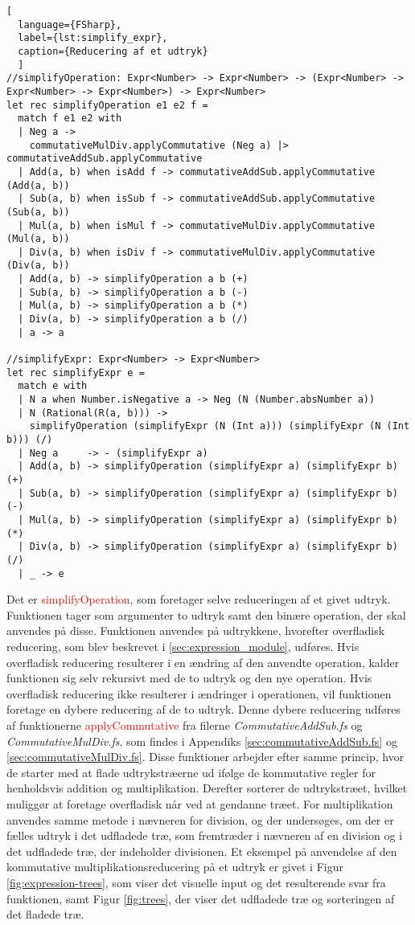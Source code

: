 \begin{lstlisting}[
  language={FSharp}, 
  label={lst:simplify_expr}, 
  caption={Reducering af et udtryk}
  ]
//simplifyOperation: Expr<Number> -> Expr<Number> -> (Expr<Number> -> Expr<Number> -> Expr<Number>) -> Expr<Number>
let rec simplifyOperation e1 e2 f = 
  match f e1 e2 with
  | Neg a -> 
    commutativeMulDiv.applyCommutative (Neg a) |> commutativeAddSub.applyCommutative
  | Add(a, b) when isAdd f -> commutativeAddSub.applyCommutative (Add(a, b))
  | Sub(a, b) when isSub f -> commutativeAddSub.applyCommutative (Sub(a, b))
  | Mul(a, b) when isMul f -> commutativeMulDiv.applyCommutative (Mul(a, b))
  | Div(a, b) when isDiv f -> commutativeMulDiv.applyCommutative (Div(a, b))
  | Add(a, b) -> simplifyOperation a b (+)
  | Sub(a, b) -> simplifyOperation a b (-)
  | Mul(a, b) -> simplifyOperation a b (*)
  | Div(a, b) -> simplifyOperation a b (/)
  | a -> a

//simplifyExpr: Expr<Number> -> Expr<Number>
let rec simplifyExpr e =
  match e with
  | N a when Number.isNegative a -> Neg (N (Number.absNumber a))
  | N (Rational(R(a, b))) -> 
    simplifyOperation (simplifyExpr (N (Int a))) (simplifyExpr (N (Int b))) (/)
  | Neg a     -> - (simplifyExpr a)
  | Add(a, b) -> simplifyOperation (simplifyExpr a) (simplifyExpr b) (+)
  | Sub(a, b) -> simplifyOperation (simplifyExpr a) (simplifyExpr b) (-)
  | Mul(a, b) -> simplifyOperation (simplifyExpr a) (simplifyExpr b) (*)
  | Div(a, b) -> simplifyOperation (simplifyExpr a) (simplifyExpr b) (/)
  | _ -> e 
\end{lstlisting}

Det er \textcolor{red}{simplifyOperation}, som foretager selve reduceringen af et givet udtryk. Funktionen tager som argumenter to udtryk samt den binære operation, der skal anvendes på disse. Funktionen anvendes på udtrykkene, hvorefter overfladisk reducering, som blev beskrevet i \ref{sec:expression_module}, udføres. Hvis overfladisk reducering resulterer i en ændring af den anvendte operation, kalder funktionen sig selv rekursivt med de to udtryk og den nye operation. Hvis overfladisk reducering ikke resulterer i ændringer i operationen, vil funktionen foretage en dybere reducering af de to udtryk. Denne dybere reducering udføres af funktionerne \textcolor{red}{applyCommutative} fra filerne \textit{CommutativeAddSub.fs} og \textit{CommutativeMulDiv.fs}, som findes i Appendiks \ref{sec:commutativeAddSub.fs} og \ref{sec:commutativeMulDiv.fs}. Disse funktioner arbejder efter samme princip, hvor de starter med at flade udtrykstræerne ud ifølge de kommutative regler for henholdsvis addition og multiplikation. Derefter sorterer de udtrykstræet, hvilket muliggør at foretage overfladisk når ved at gendanne træet. For multiplikation anvendes samme metode i nævneren for division, og der undersøges, om der er fælles udtryk i det udfladede træ, som fremtræder i nævneren af en division og i det udfladede træ, der indeholder divisionen. Et eksempel på anvendelse af den kommutative multiplikationsreducering på et udtryk er givet i Figur \ref{fig:expression-trees}, som viser det visuelle input og det resulterende svar fra funktionen, samt Figur \ref{fig:trees}, der viser det udfladede træ og sorteringen af det fladede træ.


